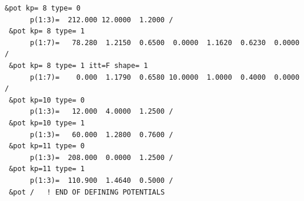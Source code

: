 \documentclass[11pt]{book}
\begin{document}
\begin{small}
\begin{lstlisting}[frame=single]
 &pot kp= 8 type= 0                                                             
      p(1:3)=  212.000 12.0000  1.2000 /                                        
 &pot kp= 8 type= 1                                                             
      p(1:7)=   78.280  1.2150  0.6500  0.0000  1.1620  0.6230  0.0000 /        
 &pot kp= 8 type= 1 itt=F shape= 1                                              
      p(1:7)=    0.000  1.1790  0.6580 10.0000  1.0000  0.4000  0.0000 /        
 &pot kp=10 type= 0                                                             
      p(1:3)=   12.000  4.0000  1.2500 /                                        
 &pot kp=10 type= 1                                                             
      p(1:3)=   60.000  1.2800  0.7600 /                                        
 &pot kp=11 type= 0                                                             
      p(1:3)=  208.000  0.0000  1.2500 /                                        
 &pot kp=11 type= 1                                                             
      p(1:3)=  110.900  1.4640  0.5000 /                                        
 &pot /   ! END OF DEFINING POTENTIALS                                          
                                                                                

\end{lstlisting}
\end{small}
\end{document}
